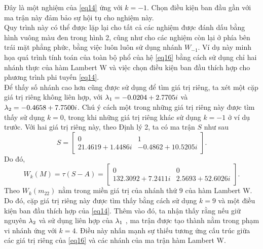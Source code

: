 Đây là một nghiệm của \eqref{eq14} ứng với $k = -1$. Chọn điều kiện ban đầu gần với ma trận này đảm bảo sự hội tụ cho nghiệm này.\\
Quy trình này có thể được lặp lại cho tất cả các nghiệm được đánh dấu bằng hình vuông màu đen trong hình 2, cũng như cho các nghiệm còn lại ở phía bên trái mặt phẳng phức, bằng việc luôn luôn sử dụng nhánh $W_{-1}$. Ví dụ này minh họa quá trình tính toán của toàn bộ phổ của hệ \eqref{eq16} bằng cách sử dụng chỉ hai nhánh thực của hàm Lambert W và việc chọn điều kiện ban đầu thích hợp cho phương trình phi tuyến \eqref{eq14}.\\
Để thấy số nhánh cao hơn cũng được sử dụng để tìm giá trị riêng, ta xét một cặp giá trị riêng không liên hợp, với $\lambda_1=-0.0204 + 2.7705i$ và $\lambda_2 = -0.4658 + 7.7500i$. Chú ý cách một trong những giá trị riêng này được tìm thấy sử dụng $k =0$, trong khi những giá trị riêng khác sử dụng $k = -1$ ở ví dụ trước. Với hai giá trị riêng này, theo Định lý 2, ta có ma trận $S$ như sau
\begin{equation*}
	S= \begin{bmatrix}
		0&1\\   21.4619 + 1.4486i & -0.4862 +10.5205i
	\end{bmatrix}.
\end{equation*}
Do đó,
\begin{equation} \label{eq42}
W_k(M)= \tau (S-A) = \begin{bmatrix}
		0&0\\   132.3092 + 7.2411i &  2.5693 + 52.6026i	
	\end{bmatrix}.
\end{equation}
Theo \cite{Cor96} $W_k(m_{22})$ nằm trong miền giá trị của nhánh thứ $9$ của hàm Lambert W. Do đó, cặp giá trị riêng này được tìm thấy bằng cách sử dụng $k = 9$ và một điều kiện ban đầu thích hợp của \eqref{eq14}. Thêm vào đó, ta nhận thấy rằng nếu giữ nguyên $\lambda_2$ và sử dụng liên hợp của $\lambda_1$ , ma trận được tạo thành nằm trong phạm vi nhánh ứng với $k =4$. Điều này nhấn mạnh sự thiếu tương ứng cấu trúc giữa các giá trị riêng của \eqref{eq16} và các nhánh của ma trận hàm Lambert W.

